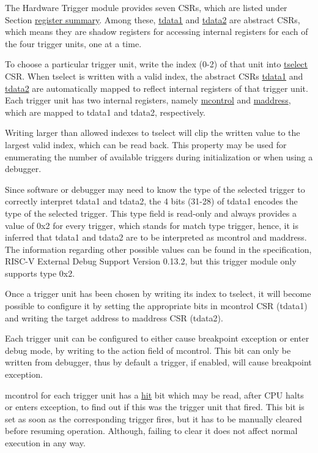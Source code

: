 \documentclass[main\_\_EN.tex]{subfiles}
\begin{document}
The Hardware Trigger module provides seven CSRs, which are listed under Section \hyperref[sec:riscvcpu-hwt-reg-summ]{register summary}. Among these, \hyperref[regdesc:TDATA1]{tdata1} and \hyperref[regdesc:TDATA2]{tdata2} are abstract CSRs, which means they are shadow registers for accessing internal registers for each of the four trigger units, one at a time.

To choose a particular trigger unit, write the index (0-2) of that unit into \hyperref[regdesc:TSELECT]{tselect} CSR. When tselect is written with a valid index, the abstract CSRs \hyperref[regdesc:TDATA1]{tdata1} and \hyperref[regdesc:TDATA2]{tdata2} are automatically mapped to reflect internal registers of that trigger unit. Each trigger unit has two internal registers, namely \hyperref[regdesc:MCONTROL]{mcontrol} and \hyperref[regdesc:MADDRESS]{maddress}, which are mapped to tdata1 and tdata2, respectively.

Writing larger than allowed indexes to tselect will clip the written value to the largest valid index, which can be read back. This property may be used for enumerating the number of available triggers during initialization or when using a debugger.

Since software or debugger may need to know the type of the selected trigger to correctly interpret tdata1 and tdata2, the 4 bits (31-28) of tdata1 encodes the type of the selected trigger. This type field is read-only and always provides a value of 0x2 for every trigger, which stands for match type trigger, hence, it is inferred that tdata1 and tdata2 are to be interpreted as mcontrol and maddress. The information regarding other possible values can be found in the specification, RISC-V External Debug Support Version 0.13.2, but this trigger module only supports type 0x2.

Once a trigger unit has been chosen by writing its index to tselect, it will become possible to configure it by setting the appropriate bits in mcontrol CSR (tdata1) and writing the target address to maddress CSR (tdata2).

Each trigger unit can be configured to either cause breakpoint exception or enter debug mode, by writing to the action field of mcontrol. This bit can only be written from debugger, thus by default a trigger, if enabled, will cause breakpoint exception.

mcontrol for each trigger unit has a \hyperref[fielddesc:MCONTROLHIT]{hit} bit which may be read, after CPU halts or enters exception, to find out if this was the trigger unit that fired. This bit is set as soon as the corresponding trigger fires, but it has to be manually cleared before resuming operation. Although, failing to clear it does not affect normal execution in any way.
\end{document}
